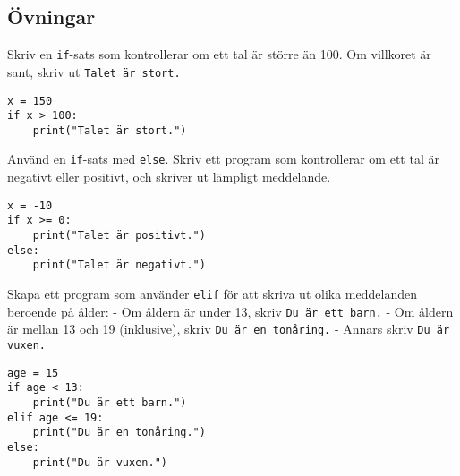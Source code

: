 \subsection{Övningar}
\begin{exercise}
Skriv en \texttt{if}-sats som kontrollerar om ett tal är större än 100. Om villkoret är sant, skriv ut \texttt{Talet är stort.}
\end{exercise}

\begin{solution}
\begin{lstlisting}
x = 150
if x > 100:
    print("Talet är stort.")
\end{lstlisting}
\end{solution}

\begin{exercise}
Använd en \texttt{if}-sats med \texttt{else}. Skriv ett program som kontrollerar om ett tal är negativt eller positivt, och skriver ut lämpligt meddelande.
\end{exercise}

\begin{solution}
\begin{lstlisting}
x = -10
if x >= 0:
    print("Talet är positivt.")
else:
    print("Talet är negativt.")
\end{lstlisting}
\end{solution}

\begin{exercise}
Skapa ett program som använder \texttt{elif} för att skriva ut olika meddelanden beroende på ålder:
- Om åldern är under 13, skriv \texttt{Du är ett barn.}
- Om åldern är mellan 13 och 19 (inklusive), skriv \texttt{Du är en tonåring.}
- Annars skriv \texttt{Du är vuxen.}
\end{exercise}

\begin{solution}
\begin{lstlisting}
age = 15
if age < 13:
    print("Du är ett barn.")
elif age <= 19:
    print("Du är en tonåring.")
else:
    print("Du är vuxen.")
\end{lstlisting}
\end{solution}


